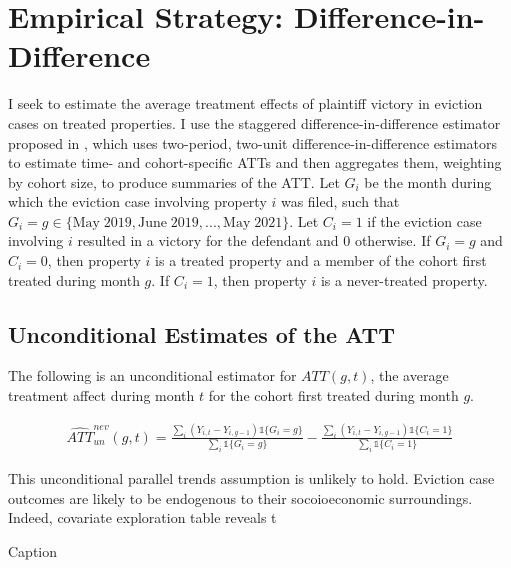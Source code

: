 \documentclass[12pt]{article}
\begin{document}
\section{Empirical Strategy: Difference-in-Difference}
    I seek to estimate the average treatment effects of plaintiff victory in eviction cases on treated properties. I use the staggered difference-in-difference estimator proposed in \cite{callaway_difference--differences_2021}, which uses two-period, two-unit difference-in-difference estimators to estimate time- and cohort-specific ATTs and then aggregates them, weighting by cohort size, to produce summaries of the ATT. Let $G_i$ be the month during which the eviction case involving property $i$ was filed, such that $G_i = g \in \{\text{May} \; 2019, \text{June} \; 2019, ..., \text{May} \; 2021\}$. Let $C_i = 1$ if the eviction case involving $i$ resulted in a victory for the defendant and $0$ otherwise. If $G_i = g$ and $C_i = 0$, then property $i$ is a treated property and a member of the cohort first treated during month $g$. If $C_i=1$, then property $i$ is a never-treated property. 

    \subsection{Unconditional Estimates of the ATT}
    The following is an unconditional estimator for $ATT(g,t)$, the average treatment affect during month $t$ for the cohort first treated during month $g$.

    \begin{align}
        \hat{ATT}^{nev}_{un}(g, t) = \frac{\sum_i(Y_{i,t} - Y_{i, g-1})\mathds{1}\{G_i=g\}}{\sum_i\mathds{1}\{G_i=g\}} - \frac{\sum_i(Y_{i,t} - Y_{i, g-1})\mathds{1}\{C_i=1\}}{\sum_i\mathds{1}\{C_i=1\}}
    \end{align}

    This unconditional parallel trends assumption is unlikely to hold. Eviction case outcomes are likely to be endogenous to their socoioeconomic surroundings. Indeed, covariate exploration table reveals t

    \begin{table}[H]
        \centering
        
        \caption{Caption}
        \label{tab:my_label}
    \end{table}
\end{document}
